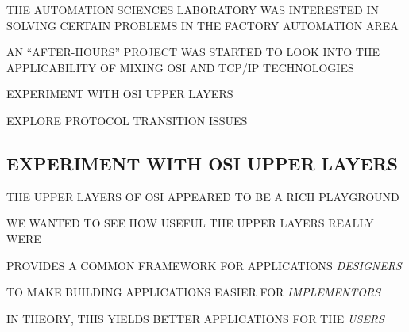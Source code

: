 \begin{bwslide}

\begin{nrtc}
\item	THE AUTOMATION SCIENCES LABORATORY WAS INTERESTED IN SOLVING CERTAIN
	PROBLEMS IN THE FACTORY AUTOMATION AREA

\item	AN ``AFTER-HOURS'' PROJECT WAS STARTED TO LOOK INTO THE APPLICABILITY
	OF MIXING OSI AND TCP/IP TECHNOLOGIES
\end{nrtc}
\end{bwslide}


\begin{bwslide}

\begin{nrtc}
\item	EXPERIMENT WITH OSI UPPER LAYERS

\item	EXPLORE PROTOCOL TRANSITION ISSUES
\end{nrtc}
\end{bwslide}


\begin{bwslide}
\part*	{EXPERIMENT WITH OSI UPPER LAYERS}\bf

\begin{nrtc}
\item	THE UPPER LAYERS OF OSI APPEARED TO BE A RICH PLAYGROUND

\item	WE WANTED TO SEE HOW USEFUL THE UPPER LAYERS REALLY WERE
\end{nrtc}
\end{bwslide}




\begin{bwslide}

\begin{nrtc}
\item	PROVIDES A COMMON FRAMEWORK FOR APPLICATIONS \emph{DESIGNERS}

\item	TO MAKE BUILDING APPLICATIONS EASIER FOR \emph{IMPLEMENTORS}

\item	IN THEORY, THIS YIELDS BETTER APPLICATIONS FOR THE \emph{USERS}
\end{nrtc}
\end{bwslide}


